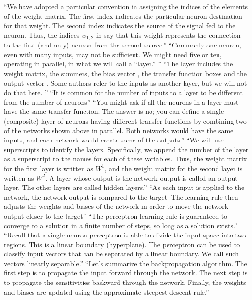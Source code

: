 \documentclass{automatextcc}
\begin{document}
``We have adopted a particular convention in assigning the indices of the elements of the weight matrix. The first index indicates the particular neuron destination for that weight. The second index indicates the source of
the signal fed to the neuron. Thus, the indices $w_{1,2}$ in say that this weight
represents the connection to the first (and only) neuron from the second
source.''
``Commonly one neuron, even with many inputs, may not be sufficient. We
might need five or ten, operating in parallel, in what we will call a “layer.” ''
``The layer includes the weight matrix, the summers, the bias vector , the transfer function boxes and the output vector . Some authors refer to the inputs as another layer, but we will not do that here. ''
``It is common for the number of inputs to a layer to be different from the number of neurons''
``You might ask if all the neurons in a layer must have the same transfer function. The answer is no; you can define a single (composite) layer of neurons having different transfer functions by combining two of the networks shown above in parallel. Both networks would have the same inputs, and each network would create some of the outputs.''
``We will use superscripts to identify the layers. Specifically, we append the number of the layer as a superscript to the names for each of these variables. Thus, the weight matrix for the first layer is written as $W^{1}$, and the weight matrix for the second layer is written as $W^{2}$. A layer whose output is the network output is called an output layer. The other layers are called hidden layers.''
``As each input is applied to the network, the network output is compared to the target. The learning rule then adjusts the weights and biases of the network in order to move the network output closer to the target''
``The perceptron learning rule is guaranteed to converge to a solution in a finite number of steps, so long as a solution exists.''
``Recall that a single-neuron perceptron is able to divide the input space into two regions. This is a linear boundary (hyperplane). The perceptron can be used to classify input vectors that can be separated by a linear boundary. We call such vectors linearly separable.''
``Let’s summarize the backpropagation algorithm. The first step is to propagate the input forward through the network. The next step is to propagate the sensitivities backward through the network. Finally, the weights and biases are updated using the approximate steepest descent rule.''
\end{document}
